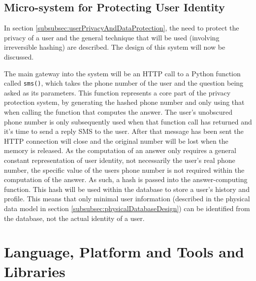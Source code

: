 \documentclass[authoryearcitations]{UoYCSproject}
\begin{document}
\subsection{Micro-system for Protecting User Identity}
\label{subsec:hashingUserId}

In section \ref{subsubsec:userPrivacyAndDataProtection}, the need to protect the privacy of a user and the general technique that will be used (involving irreversible hashing) are described.  The design of this system will now be discussed.

The main gateway into the system will be an HTTP call to a Python function called \texttt{sms()}, which takes the phone number of the user and the question being asked as its parameters.  This function represents a core part of the privacy protection system, by generating the hashed phone number and only using that when calling the function that computes the answer.  The user's unobscured phone number is only subsequently used when that function call has returned and it's time to send a reply SMS to the user. After that message has been sent the HTTP connection will close and the original number will be lost when the memory is released. As the computation of an answer only requires a general constant representation of user identity, not necessarily the user's real phone number, the specific value of the users phone number is not required within the computation of the answer.  As such, a hash is passed into the answer-computing function.  This hash will be used within the database to store a user's history and profile.  This means that only minimal user information (described in the physical data model in section \ref{subsubsec:physicalDatabaseDesign}) can be identified from the database, not the actual identity of a user.

\section{Language, Platform and Tools and Libraries}
\end{document}
